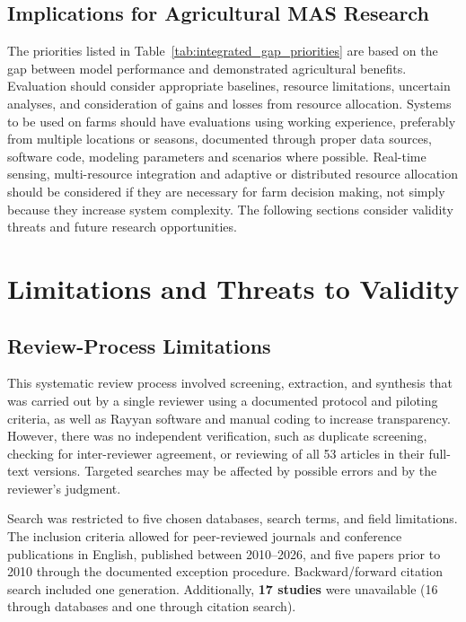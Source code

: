 \documentclass[11pt,a4paper]{article}
\begin{document}
\subsection{Implications for Agricultural MAS Research}

The priorities listed in Table~\ref{tab:integrated_gap_priorities} are based on
the gap between model performance and demonstrated agricultural benefits. Evaluation should consider appropriate baselines, resource limitations, uncertain analyses, and consideration of gains and losses from resource allocation. Systems to be used on farms should have evaluations using working experience, preferably from multiple locations or seasons, documented through
proper data sources, software code, modeling parameters and scenarios where possible. Real-time sensing, multi-resource integration and adaptive or distributed resource allocation should be considered if they are necessary for farm decision making, not simply because they increase system complexity. The following sections consider validity threats and future research opportunities.






\section{Limitations and Threats to Validity}

\subsection{Review-Process Limitations}

This systematic review process involved screening, extraction, and synthesis that was carried out by a single reviewer using a documented protocol and piloting criteria, as well as Rayyan software and manual coding to increase transparency. However, there was no independent verification, such as duplicate screening, checking for inter-reviewer agreement, or reviewing of all 53 articles in their full-text versions. Targeted searches may be affected by possible errors and by the reviewer's judgment.

Search was restricted to five chosen databases, search terms, and field limitations. The inclusion criteria allowed for peer-reviewed journals and conference publications in English, published between 2010--2026, and five papers prior to 2010 through the documented exception procedure. Backward/forward citation search included one generation. Additionally, \textbf{17 studies} were unavailable (16 through databases and one through citation search).
\end{document}
